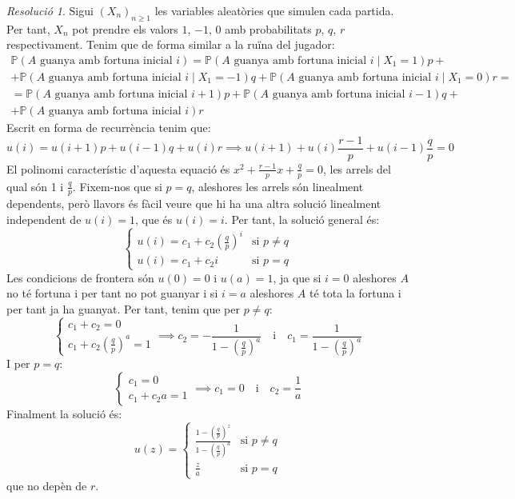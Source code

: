 \documentclass[10pt,a4paper]{article}
\newcommand{\Prob}{\ensuremath{\mathbb{P}}} %
\theoremstyle{definition}
\theoremstyle{remark}
\newtheorem*{res}{Resolució}
\begin{document}
\begin{res}
  Sigui $(X_n)_{n\geq 1}$ les variables aleatòries que simulen cada partida. Per tant, $X_n$ pot prendre els valors $1$, $-1$, $0$ amb probabilitats $p$, $q$, $r$ respectivament. Tenim que de forma similar a la ruïna del jugador:
  \begin{multline*}
    \Prob(\text{$A$ guanya amb fortuna inicial $i$})=\Prob(\text{$A$ guanya amb fortuna inicial $i$}\mid X_1=1)p+\\+\Prob(\text{$A$ guanya amb fortuna inicial $i$}\mid X_1=-1)q+\Prob(\text{$A$ guanya amb fortuna inicial $i$}\mid X_1=0)r=\\=
    \Prob(\text{$A$ guanya amb fortuna inicial $i+1$})p+\Prob(\text{$A$ guanya amb fortuna inicial $i-1$})q+\\+\Prob(\text{$A$ guanya amb fortuna inicial $i$})r
  \end{multline*}
  Escrit en forma de recurrència tenim que:
  $$u(i)=u(i+1)p+u(i-1)q+u(i)r\implies u(i+1)+u(i)\frac{r-1}{p}+u(i-1)\frac{q}{p}=0$$
  El polinomi característic d'aquesta equació és $x^2+\frac{r-1}{p}x+\frac{q}{p}=0$, les arrels del qual són 1 i $\frac{q}{p}$. Fixem-nos que si $p=q$, aleshores les arrels són linealment dependents, però llavors és fàcil veure que hi ha una altra solució linealment independent de $u(i)=1$, que és $u(i)=i$. Per tant, la solució general és:
  $$
    \begin{cases}
      u(i)=c_1+c_2{\left(\frac{q}{p}\right)}^i & \text{si $p\ne q$} \\
      u(i)=c_1+c_2i                            & \text{si $p=q$}
    \end{cases}
  $$
  Les condicions de frontera són $u(0)=0$ i $u(a)=1$, ja que si $i=0$ aleshores $A$ no té fortuna i per tant no pot guanyar i si $i=a$ aleshores $A$ té tota la fortuna i per tant ja ha guanyat. Per tant, tenim que per $p\ne q$:
  $$
    \begin{cases}
      c_1+c_2=0 \\
      c_1+c_2{\left(\frac{q}{p}\right)}^a=1
    \end{cases}\implies
    c_2=-\frac{1}{1-{\left(\frac{q}{p}\right)}^a}\quad\text{i}\quad c_1=\frac{1}{1-{\left(\frac{q}{p}\right)}^a}
  $$
  I per $p=q$:
  $$
    \begin{cases}
      c_1=0 \\
      c_1+c_2a=1
    \end{cases}\implies
    c_1=0\quad\text{i}\quad c_2=\frac{1}{a}
  $$
  Finalment la solució és:
  $$u(z)=
    \begin{cases}
      \frac{1-{\left(\frac{q}{p}\right)}^z}{1-{\left(\frac{q}{p}\right)}^a} & \text{si $p\ne q$} \\
      \frac{z}{a}                                                           & \text{si $p=q$}
    \end{cases}
  $$
  que no depèn de $r$.
\end{res}
\end{document}
